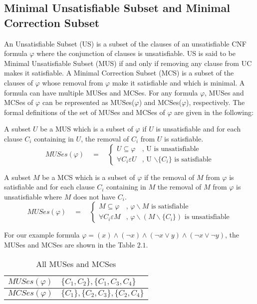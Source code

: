 \subsection{Minimal Unsatisfiable Subset and Minimal Correction Subset}
An Unsatisfiable Subset (US) is a subset of the clauses of an unsatisfiable CNF formula $\varphi$ where the conjunction of clauses is unsatisfiable. US is said to be Minimal Unsatisfiable Subset (MUS) if and only if removing any clause from UC makes it satisfiable. A Minimal Correction Subset (MCS) is a subset of the clauses of $\varphi$ whose removal from $\varphi$ make it satisfiable and which is minimal. A formula can have multiple MUSes and MCSes. For any formula $\varphi$, MUSes and MCSes of $\varphi$ can be represented as MUSes($\varphi$) and MCSes($\varphi$), respectively. The formal definitions of the set of MUSes and MCSes of $\varphi$ are given in the following:
\begin{definition}[MUS]
	\label{def:mus}
A subset $U$ be a MUS which is a subset of $\varphi$ if $U$ is unsatisfiable and for each clause $C_{i}$ containing in $U$, the removal of $C_{i}$ from $U$ is satisfiable.
$$MUSes(\varphi)
\quad = \quad 
\left\{
\begin{array}{ll}
{\displaystyle U \subseteq \varphi} 
& 
\text{, U is unsatisfiable }
\\[0.6cm] %
{\displaystyle\forall C_{i} \varepsilon U} & \text{, U $\backslash \{C_{i}\}$ is satisfiable}
\end{array}
\right.$$
\end{definition}
\begin{definition}[MCS]
	\label{def:mcs}
A subset $M$ be a MCS which is a subset of $\varphi$ if the removal of $M$ from $\varphi$ is satisfiable and for each clause $C_{i}$ containing in $M$ the removal of $M$ from $\varphi$ is unsatisfiable where $M$ does not have $C_{i}$.
$$MUSes(\varphi)
\quad = \quad 
\left\{
\begin{array}{ll}
{\displaystyle M \subseteq \varphi} 
& 
\text{, $\varphi\backslash M$ is satisfiable}
\\[0.6cm] %
{\displaystyle\forall C_{i} \varepsilon M} & \text{, $\varphi\backslash(M\backslash\{C_{i}\})$ is unsatisfiable}
\end{array}
\right.$$
\end{definition}
For our example formula $\varphi=(x)\wedge(\neg x)\wedge(\neg x\vee y)\wedge(\neg x \vee \neg y)$, the MUSes and MCSes are shown in the Table $2.1$.
\begin{table}[]
	\centering
	\caption{All MUSes and MCSes}
	\label{my-label}
	\begin{tabular}{|l|l|}
		\hline
		$MUSes(\varphi)$ & $\{C_{1},C_{2}\},\{C_{1},C_{3},C_{4}\}$ \\ \hline
		$MCSes(\varphi)$ & $\{C_{1}\},\{C_{2},C_{3}\},\{C_{2},C_{4}\}$ \\ \hline
	\end{tabular}
\end{table}
